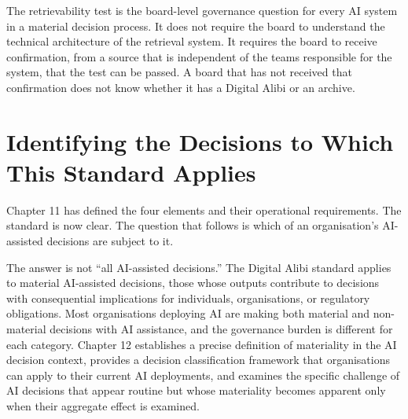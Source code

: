 The retrievability test is the board-level governance question for every AI system in a material decision process. It does not require the board to understand the technical architecture of the retrieval system. It requires the board to receive confirmation, from a source that is independent of the teams responsible for the system, that the test can be passed. A board that has not received that confirmation does not know whether it has a Digital Alibi or an archive.

\scenebreak

\section{Identifying the Decisions to Which This Standard Applies}

Chapter 11 has defined the four elements and their operational requirements. The standard is now clear. The question that follows is which of an organisation's AI-assisted decisions are subject to it.

The answer is not ``all AI-assisted decisions.'' The Digital Alibi standard applies to material AI-assisted decisions, those whose outputs contribute to decisions with consequential implications for individuals, organisations, or regulatory obligations. Most organisations deploying AI are making both material and non-material decisions with AI assistance, and the governance burden is different for each category. Chapter 12 establishes a precise definition of materiality in the AI decision context, provides a decision classification framework that organisations can apply to their current AI deployments, and examines the specific challenge of AI decisions that appear routine but whose materiality becomes apparent only when their aggregate effect is examined.
